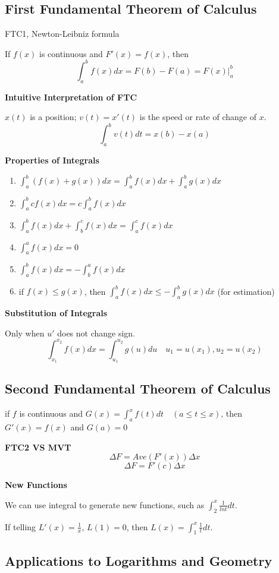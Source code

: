\documentclass{article}
\newcommand\defint[3]{\int_{#1}^{#2}#3dx}
\newcommand\upperxdefint[2]{\int_{#1}^x{#2}dt}
\begin{document}
\subsection{First Fundamental Theorem of Calculus}

FTC1, Newton-Leibniz formula

If $f(x)$ is continuous and $F'(x) = f(x)$, then
$$\defint{a}{b}{f(x)} = F(b) - F(a) = F(x)\big|_a^b$$

\textbf{Intuitive Interpretation of FTC}

$x(t)$ is a position; $v(t) = x'(t)$ is the speed or rate of change of $x$.
$$\int_a^bv(t)dt = x(b) - x(a)$$

\textbf{Properties of Integrals}
\begin{enumerate}
  \item $\defint{a}{b}{(f(x) + g(x))} = \defint{a}{b}{f(x)} + \defint{a}{b}{g(x)}$
  \item $\defint{a}{b}{cf(x)} = c\defint{a}{b}{f(x)}$
  \item $\defint{a}{b}{f(x)} + \defint{b}{c}{f(x)} = \defint{a}{c}{f(x)}$
  \item $\defint{a}{a}{f(x)} = 0$
  \item $\defint{a}{b}{f(x)} = -\defint{b}{a}{f(x)}$
  \item if $f(x) \leq g(x)$, then $\defint{a}{b}{f(x)} \leq -\defint{a}{b}{g(x)}$ (for estimation)
\end{enumerate}

\textbf{Substitution of Integrals}

Only when $u'$ does not change sign.
$$\int_{x_1}^{x_2}f(x)dx = \int_{u_1}^{u_2}g(u)du \quad u_1 = u(x_1), u_2 = u(x_2)$$

\subsection{Second Fundamental Theorem of Calculus}
if $f$ is continuous and $G(x) = \int_a^xf(t)dt \quad (a \leq t \leq x)$, then $G'(x) = f(x)$ and $G(a) = 0$

\textbf{FTC2 VS MVT}
$$\Delta F = Ave(F'(x))\Delta x$$
$$\Delta F = F'(c)\Delta x$$

\textbf{New Functions}

We can use integral to generate new functions, such as $\upperxdefint{2}{\frac{1}{lnt}}$.

If telling $L'(x) = \frac{1}{x}$, $L(1) = 0$, then $L(x) = \upperxdefint{1}{\frac{1}{t}}$.

\subsection{Applications to Logarithms and Geometry}
\end{document}
